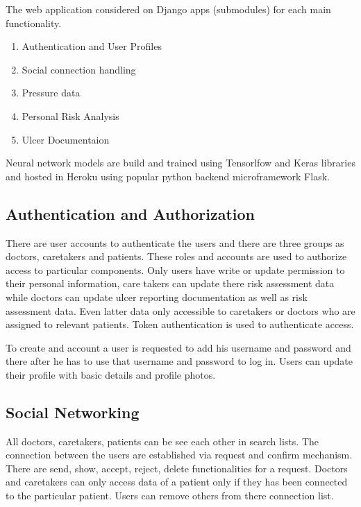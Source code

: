 The web application considered on Django apps (submodules) for each main functionality.
\begin{enumerate}
	\item Authentication and User Profiles
	\item Social connection handling
	\item Pressure data
	\item Personal Risk Analysis
	\item Ulcer Documentaion
\end{enumerate}

Neural network models are build and trained using Tensorlfow\textsuperscript{\textregistered} and Keras\textsuperscript{\textregistered} libraries and hosted in Heroku\textsuperscript{\textregistered} using popular python backend microframework Flask\textsuperscript{\textregistered}.


\subsection{Authentication and Authorization}

There are user accounts to authenticate the users and there are three groups as doctors, caretakers and patients. These roles and accounts are used to authorize access to particular components. Only users have write or update permission to their personal information, care takers can update there risk assessment data while doctors can update ulcer reporting documentation as well as risk assessment data. Even latter data only accessible to caretakers or doctors who are assigned to relevant patients. Token authentication is used to authenticate access.

To create and account a user is requested to add his username and password and there after he has to use that username and password to log in. Users can update their profile with basic details and profile photos.

\subsection{Social Networking}

All doctors, caretakers, patients can be see each other in search lists. The connection between the users are established via request and confirm mechanism. There are send, show, accept, reject, delete functionalities for a request. Doctors and caretakers can only access data of a patient only if they has been connected to the particular patient. Users can remove others from there connection list. 

